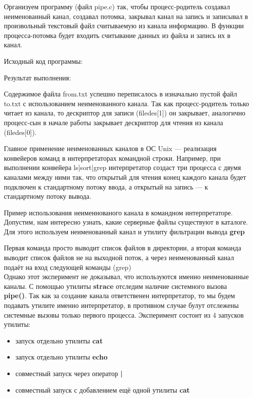 \documentclass[a4paper]{article}
\begin{document}
	Организуем программу (файл pipe.c) так, чтобы процесс-родитель создавал неименованный канал, создавал потомка, закрывал канал на запись и записывал в произвольный текстовый файл считываемую из канала информацию. В функции процесса-потомка будет входить считывание данных из файла и запись их в канал.
	
	Исходный код программы:
	
	
	Результат выполнения:
	

	Содержимое файла from.txt успешно переписалось в изначально пустой файл to.txt с использованием неименованного канала.	Так как процесс-родитель только читает из канала, то дескриптор для записи (filedes[1]) он закрывает, аналогично процесс-сын в начале работы закрывает дескриптор для чтения из канала (filedes[0]).

	Главное применение неименованных каналов в ОС Unix --– реализация конвейеров команд в интерпретаторах командной строки. Например, при выполнении конвейера ls|sort|grep интерпретатор создаст три процесса с двумя каналами между ними так, что открытый для чтения конец каждого канала будет подключен к стандартному потоку ввода, а открытый на запись — к стандартному потоку вывода.
	
	Пример использования неименнованого канала в командном интерпретаторе. Допустим, нам интересно узнать, какие серверные файлы существуют в каталоге. Для этого используем неименованный канал и утилиту фильтрации вывода \textbf{grep}
	
	Первая команда просто выводит список файлов в директории, а вторая команда выводит список файлов не на выходной поток, а через неименованный канал подаёт на вход следующей команды (grep)\\
	
	Однако этот эксперимент не доказывал, что используются именно неименованные каналы. С помощью утилиты \textbf{strace} отследим наличие системного вызова \textbf{pipe()}. Так как за создание канала ответственен интерпретатор, то мы будем подавать утилите именно интерпретатор, в противном случае булут отслежены системные вызовы только первого процесса. Эксперимент состоит из 4 запусков утилиты:
	\begin{itemize}
		\item запуск отдельно утилиты \textbf{cat}
		\item запуск отдельно утилиты \textbf{echo}
		\item совместный запуск через оператор \textbf{|}
		\item совместный запуск с добавлением ещё одной утилиты \textbf{cat}
	\end{itemize}	 
	
\end{document}
